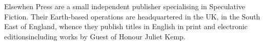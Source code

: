 Elsewhen Press are a small independent publisher specialising in
Speculative Fiction. Their Earth-based operations are headquartered in
the UK, in the South East of England, whence they publish titles in
English in print and electronic editions\textemdash including works
by Guest of Honour Juliet Kemp.

